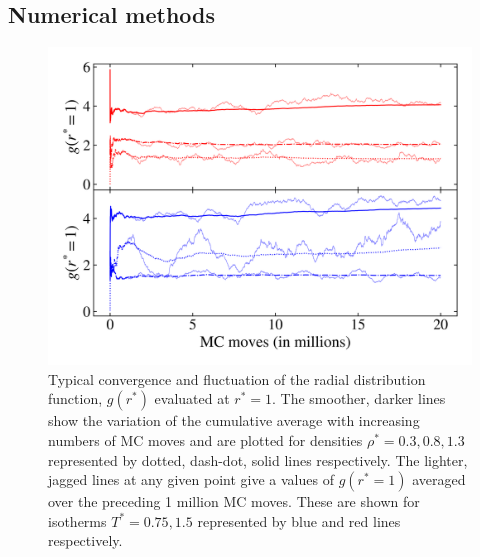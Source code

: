 \documentclass[10pt, twocolumn]{revtex4}    %
\begin{document}
\subsection{Numerical methods} \label{ss:numerical}

\begin{figure}
	\includegraphics[width=\linewidth]{figures/convergence/gAtSigma_convergence.png}
	\caption{Typical convergence and fluctuation of the radial distribution function, $g(r^{*})$ evaluated at $r^{*}=1$. The smoother, darker lines show the variation of the cumulative average with increasing numbers of MC moves and are plotted for densities $\rho^{*} = 0.3, 0.8, 1.3$ represented by dotted, dash-dot, solid lines respectively. The lighter, jagged lines at any given point give a values of $g(r^{*}=1)$ averaged over the preceding 1 million MC moves. These are shown for isotherms $T^{*} = 0.75, 1.5$ represented by blue and red lines respectively. 
	}
	\label{fig:convergence}
\end{figure}
\end{document}
